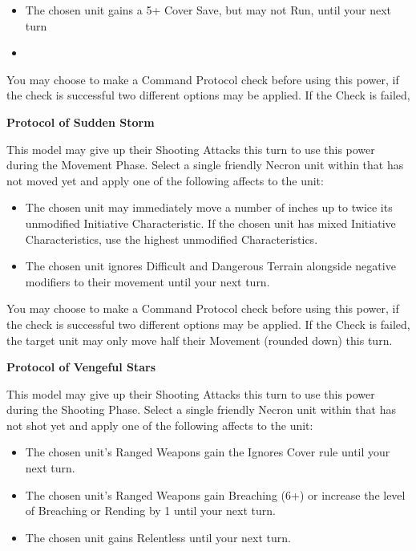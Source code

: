 \begin{multicols}{2}
\begin{itemize}
	\itemsep 0pt
	\item The chosen unit gains a 5+ Cover Save, but may not Run, until your next turn
	\item 
\end{itemize}

You may choose to make a Command Protocol check before using this power, if the check is successful two different options may be applied. If the Check is failed, %

\textbf{Protocol of Sudden Storm}

This model may give up their Shooting Attacks this turn to use this power during the Movement Phase. Select a single friendly Necron unit within  that has not moved yet and apply one of the following affects to the unit:

\begin{itemize}
	\itemsep 0pt
	\item The chosen unit may immediately move a number of inches up to twice its unmodified Initiative Characteristic. If the chosen unit has mixed Initiative Characteristics, use the highest unmodified Characteristics.
	\item The chosen unit ignores Difficult and Dangerous Terrain alongside negative modifiers to their movement until your next turn.
\end{itemize}

You may choose to make a Command Protocol check before using this power, if the check is successful two different options may be applied. If the Check is failed, the target unit may only move half their Movement (rounded down) this turn.

\textbf{Protocol of Vengeful Stars}

This model may give up their Shooting Attacks this turn to use this power during the Shooting Phase. Select a single friendly Necron unit within  that has not shot yet and apply one of the following affects to the unit:

\begin{itemize}
	\itemsep 0pt
	\item The chosen unit's Ranged Weapons gain the Ignores Cover rule until your next turn.
	\item The chosen unit's Ranged Weapons gain Breaching (6+) or increase the level of Breaching or Rending by 1 until your next turn.
	\item The chosen unit gains Relentless until your next turn.
\end{itemize}


\end{multicols}
